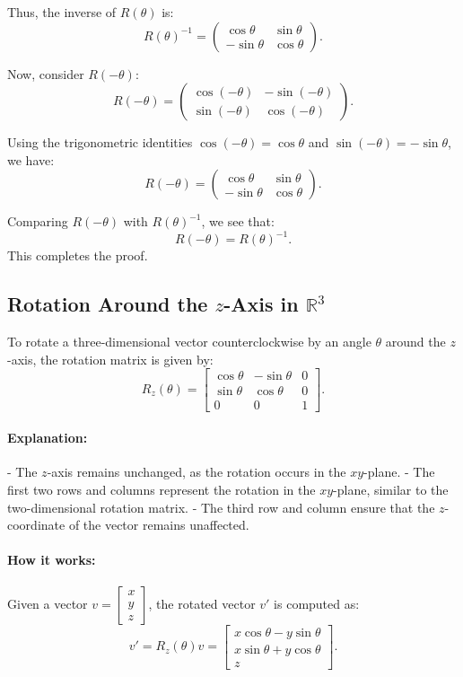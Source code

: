 \documentclass{article}
\begin{document}
Thus, the inverse of $R(\theta)$ is:
\[R(\theta)^{-1} = \begin{pmatrix}
\cos{\theta} & \sin{\theta} \\
-\sin{\theta} & \cos{\theta}
\end{pmatrix}.\]

Now, consider $R(-\theta)$:
\[R(-\theta) = \begin{pmatrix}
\cos{(-\theta)} & -\sin{(-\theta)} \\
\sin{(-\theta)} & \cos{(-\theta)}
\end{pmatrix}.\]

Using the trigonometric identities $\cos{(-\theta)} = \cos{\theta}$ and $\sin{(-\theta)} = -\sin{\theta}$, we have:
\[R(-\theta) = \begin{pmatrix}
\cos{\theta} & \sin{\theta} \\
-\sin{\theta} & \cos{\theta}
\end{pmatrix}.\]

Comparing $R(-\theta)$ with $R(\theta)^{-1}$, we see that:
\[R(-\theta) = R(\theta)^{-1}.\]
This completes the proof.


\subsection*{Rotation Around the $z$-Axis in $\mathbb{R}^3$}
To rotate a three-dimensional vector counterclockwise by an angle $\theta$ around the $z$-axis, the rotation matrix is given by:
\[R_z(\theta) = \begin{bmatrix}
\cos \theta & -\sin \theta & 0 \\
\sin \theta & \cos \theta & 0 \\
0 & 0 & 1
\end{bmatrix}.\]

\paragraph{Explanation:}
- The $z$-axis remains unchanged, as the rotation occurs in the $xy$-plane.
- The first two rows and columns represent the rotation in the $xy$-plane, similar to the two-dimensional rotation matrix.
- The third row and column ensure that the $z$-coordinate of the vector remains unaffected.

\paragraph{How it works:}
Given a vector $v = \begin{bmatrix} x \\ y \\ z \end{bmatrix}$, the rotated vector $v'$ is computed as:
\[v' = R_z(\theta) v = \begin{bmatrix}
x \cos \theta - y \sin \theta \\
x \sin \theta + y \cos \theta \\
z
\end{bmatrix}.\]
\end{document}
